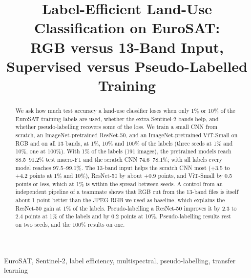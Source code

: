 \documentclass[conference]{IEEEtran}
\begin{document}
\title{Label-Efficient Land-Use Classification on EuroSAT:\\
RGB versus 13-Band Input, Supervised versus Pseudo-Labelled Training}

\author{
\and
{}
\and
{}
\and
{}
}

\maketitle

\begin{abstract}
We ask how much test accuracy a land-use classifier loses when only 1\% or 10\% of the EuroSAT training labels are used, whether the extra Sentinel-2 bands help, and whether pseudo-labelling recovers some of the loss. We train a small CNN from scratch, an ImageNet-pretrained ResNet-50, and an ImageNet-pretrained ViT-Small on RGB and on all 13 bands, at 1\%, 10\% and 100\% of the labels (three seeds at 1\% and 10\%, one at 100\%). With 1\% of the labels (191 images), the pretrained models reach 88.5--91.2\% test macro-F1 and the scratch CNN 74.6--78.1\%; with all labels every model reaches 97.5--99.1\%. The 13-band input helps the scratch CNN most (+3.5 to +4.2 points at 1\% and 10\%), ResNet-50 by about +0.9 points, and ViT-Small by 0.5 points or less, which at 1\% is within the spread between seeds. A control from an independent pipeline of a teammate shows that RGB cut from the 13-band files is itself about 1 point better than the JPEG RGB we used as baseline, which explains the ResNet-50 gain at 1\% of the labels. Pseudo-labelling a ResNet-50 improves it by 2.3 to 2.4 points at 1\% of the labels and by 0.2 points at 10\%. Pseudo-labelling results rest on two seeds, and the 100\% results on one.
\end{abstract}

\begin{IEEEkeywords}
EuroSAT, Sentinel-2, label efficiency, multispectral, pseudo-labelling, transfer learning
\end{IEEEkeywords}
\end{document}
